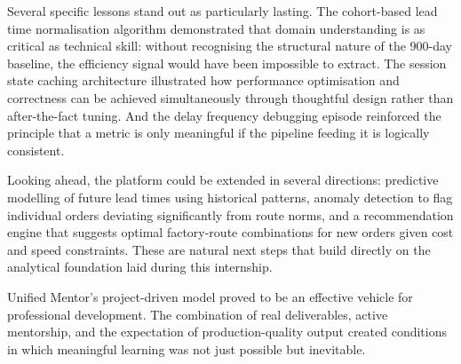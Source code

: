 \documentclass[12pt, a4paper]{report}
\begin{document}
Several specific lessons stand out as particularly lasting. The cohort-based
lead time normalisation algorithm demonstrated that domain understanding
is as critical as technical skill: without recognising the structural nature
of the 900-day baseline, the efficiency signal would have been impossible
to extract. The session state caching architecture illustrated how
performance optimisation and correctness can be achieved simultaneously
through thoughtful design rather than after-the-fact tuning. And the delay
frequency debugging episode reinforced the principle that a metric is only
meaningful if the pipeline feeding it is logically consistent.

Looking ahead, the platform could be extended in several directions: predictive
modelling of future lead times using historical patterns, anomaly detection
to flag individual orders deviating significantly from route norms, and
a recommendation engine that suggests optimal factory-route combinations
for new orders given cost and speed constraints. These are natural next
steps that build directly on the analytical foundation laid during this
internship.

Unified Mentor's project-driven model proved to be an effective vehicle
for professional development. The combination of real deliverables, active
mentorship, and the expectation of production-quality output created
conditions in which meaningful learning was not just possible but inevitable.
\end{document}
